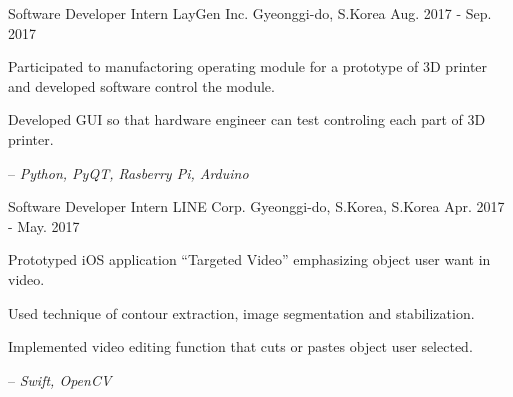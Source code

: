 \begin{cventries}
  \cventry
    {Software Developer Intern} %
    {LayGen Inc.} %
    {Gyeonggi-do, S.Korea} %
    {Aug. 2017 - Sep. 2017} %
    {
      \begin{cvitems} %
        \item {Participated to manufactoring operating module for a prototype of 3D printer and developed software control the module.}
        \item {Developed GUI so that hardware engineer can test controling each part of 3D printer.}
        \item[--] \textit{Python, PyQT, Rasberry Pi, Arduino}
      \end{cvitems}
    }

  \cventry
    {Software Developer Intern} %
    {LINE Corp.} %
    {Gyeonggi-do, S.Korea, S.Korea} %
    {Apr. 2017 - May. 2017} %
    {
      \begin{cvitems} %
        \item {Prototyped iOS application ``Targeted Video'' emphasizing object user want in video.}
        \item {Used technique of contour extraction, image segmentation and stabilization.}
        \item {Implemented video editing function that cuts or pastes object user selected.}
        \item[--] \textit{Swift, OpenCV}
      \end{cvitems}
    }


\end{cventries}

